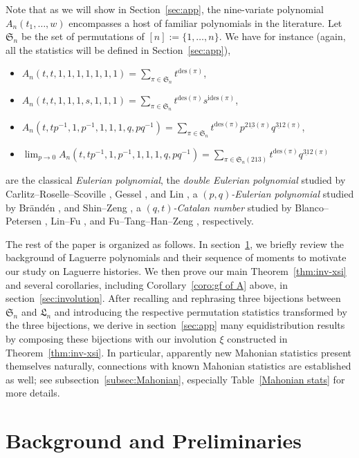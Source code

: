 \documentclass[12pt]{amsart}
\numberwithin{equation}{section}
\theoremstyle{plain}
\theoremstyle{definition}
\def\SS{\mathfrak{S}}
\def\LH{\mathfrak{L}}
\def\des{\mathrm{des}}
\def\ides{\mathrm{ides}}
\def\pprs{\mathrm{2\underline{13}}}
\def\pp31-2{\mathrm{\underline{31}2}}
\begin{document}
Note that as we will show in Section~\ref{sec:app}, the nine-variate polynomial $A_n(t_1,\ldots,w)$ encompasses a host of familiar polynomials in the literature. Let $\SS_n$ be the set of permutations of $[n]:=\{1,\ldots,n\}$. We have for instance (again, all the statistics will be defined in Section~\ref{sec:app}),
\begin{itemize}
  \item $A_n(t,t,1,1,1,1,1,1,1)=\sum_{\pi\in\SS_n}t^{\des(\pi)}$,
  \item $A_n(t,t,1,1,1,s,1,1,1)=\sum_{\pi\in\SS_n}t^{\des(\pi)}s^{\ides(\pi)}$,
  \item $A_n(t,tp^{-1},1,p^{-1},1,1,1,q,pq^{-1})=\sum_{\pi\in\SS_n}t^{\des(\pi)}p^{\pprs(\pi)}q^{\pp31-2(\pi)}$,
  \item $\lim_{p\rightarrow 0}A_n(t,tp^{-1},1,p^{-1},1,1,1,q,pq^{-1})=\sum_{\pi\in\SS_n(213)}t^{\des(\pi)}q^{\pp31-2(\pi)}$
\end{itemize}
are the classical {\it Eulerian polynomial}, the {\it double Eulerian polynomial} studied by Carlitz--Roselle--Scoville \cite{CRS}, Gessel \cite{Bra08,Bra15}, and Lin \cite{Lin}, a {\it $(p,q)$-Eulerian polynomial} studied by Br\"and\'en \cite{Bra08}, and Shin--Zeng \cite{SZ12}, a {\it $(q,t)$-Catalan number} studied by Blanco--Petersen \cite{BP}, Lin--Fu \cite{LF}, and Fu--Tang--Han--Zeng \cite{FTHZ}, respectively.

The rest of the paper is organized as follows. In section~\ref{sec:Preliminaries}, we briefly review the background of Laguerre polynomials and their sequence of moments to motivate our study on Laguerre histories. We then prove our main Theorem~\ref{thm:inv-xsi} and several corollaries, including Corollary~\ref{coro:gf of A} above, in section~\ref{sec:involution}. After recalling and rephrasing three bijections between $\SS_n$ and $\LH_n$ and introducing the respective permutation statistics transformed by the three bijections, we derive in section~\ref{sec:app} many equidistribution results by composing these bijections with our involution $\xi$ constructed in Theorem~\ref{thm:inv-xsi}. In particular, apparently new Mahonian statistics present themselves naturally, connections with known Mahonian statistics are established as well; see subsection~\ref{subsec:Mahonian}, especially Table~\ref{Mahonian stats} for more details.


\section{Background and Preliminaries}\label{sec:Preliminaries}
\end{document}
